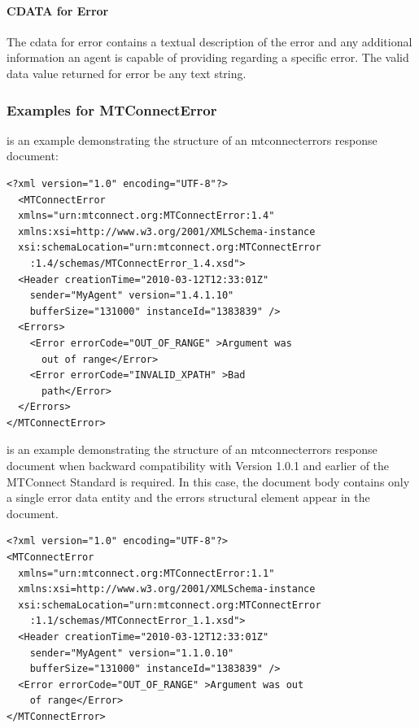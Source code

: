 \newpage



\paragraph{CDATA for Error}\mbox{}

The \gls{cdata} for \gls{error} contains a textual description of the error and any additional information an \gls{agent} is capable of providing regarding a specific error.  The \gls{valid data value} returned for \gls{error} \MAY be any text string.

\subsubsection{Examples for MTConnectError}

 is an example demonstrating the structure of an \gls{mtconnecterrors response document}:

\begin{lstlisting}[firstnumber=1,escapechar=|,% 
caption={Example of structure for MTConnectError}, label={lst:structure-for-mtconnecterror}]
<?xml version="1.0" encoding="UTF-8"?>
  <MTConnectError
  xmlns="urn:mtconnect.org:MTConnectError:1.4"
  xmlns:xsi=http://www.w3.org/2001/XMLSchema-instance
  xsi:schemaLocation="urn:mtconnect.org:MTConnectError
    :1.4/schemas/MTConnectError_1.4.xsd">
  <Header creationTime="2010-03-12T12:33:01Z"
    sender="MyAgent" version="1.4.1.10" 
    bufferSize="131000" instanceId="1383839" />
  <Errors>
    <Error errorCode="OUT_OF_RANGE" >Argument was 
      out of range</Error>
    <Error errorCode="INVALID_XPATH" >Bad 
      path</Error>
  </Errors>
</MTConnectError>
\end{lstlisting}

 is an example demonstrating the structure of an \gls{mtconnecterrors response document} when backward compatibility with Version 1.0.1 and earlier of the MTConnect Standard is required.  In this case, the \gls{document body} contains only a single \gls{error} \gls{data entity} and the \gls{errors} \gls{structural element} \MUSTNOT appear in the document. 

\begin{lstlisting}[firstnumber=1,escapechar=|,% 
caption={Example of structure for MTConnectError when backward compatibility is required}, label={lst:structure-for-mtconnecterror-when-backward-compatibility-is-required}]
<?xml version="1.0" encoding="UTF-8"?>
<MTConnectError
  xmlns="urn:mtconnect.org:MTConnectError:1.1"
  xmlns:xsi=http://www.w3.org/2001/XMLSchema-instance
  xsi:schemaLocation="urn:mtconnect.org:MTConnectError
    :1.1/schemas/MTConnectError_1.1.xsd">
  <Header creationTime="2010-03-12T12:33:01Z"
    sender="MyAgent" version="1.1.0.10" 
    bufferSize="131000" instanceId="1383839" />
  <Error errorCode="OUT_OF_RANGE" >Argument was out 
    of range</Error>
</MTConnectError>
\end{lstlisting}

